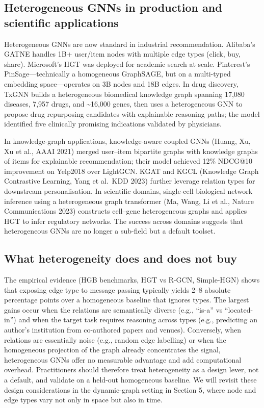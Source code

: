 \documentclass{article}
\begin{document}
\subsection{Heterogeneous GNNs in production and scientific applications}\label{heterogeneous-gnns-in-production-and-scientific-applications}

Heterogeneous GNNs are now standard in industrial recommendation. Alibaba's GATNE handles 1B+ user/item nodes with multiple edge types (click, buy, share). Microsoft's HGT was deployed for academic search at scale. Pinterest's PinSage---technically a homogeneous GraphSAGE, but on a multi-typed embedding space---operates on 3B nodes and 18B edges. In drug discovery, TxGNN \citep{huang20242024} builds a heterogeneous biomedical knowledge graph spanning 17,080 diseases, 7,957 drugs, and \textasciitilde16,000 genes, then uses a heterogeneous GNN to propose drug repurposing candidates with explainable reasoning paths; the model identified five clinically promising indications validated by physicians.

In knowledge-graph applications, knowledge-aware coupled GNNs (Huang, Xu, Xu et al., AAAI 2021) merged user--item bipartite graphs with knowledge graphs of items for explainable recommendation; their model achieved 12\% NDCG@10 improvement on Yelp2018 over LightGCN. KGAT \citep{wang2019heterogeneousgraph} and KGCL (Knowledge Graph Contrastive Learning, Yang et al.~KDD 2023) further leverage relation types for downstream personalisation. In scientific domains, single-cell biological network inference using a heterogeneous graph transformer (Ma, Wang, Li et al., Nature Communications 2023) constructs cell--gene heterogeneous graphs and applies HGT to infer regulatory networks. The success across domains suggests that heterogeneous GNNs are no longer a sub-field but a default toolset.

\subsection{What heterogeneity does and does not buy}\label{what-heterogeneity-does-and-does-not-buy}

The empirical evidence (HGB benchmarks, HGT vs R-GCN, Simple-HGN) shows that exposing edge type to message passing typically yields 2--8 absolute percentage points over a homogeneous baseline that ignores types. The largest gains occur when the relations are semantically diverse (e.g., ``is-a'' vs ``located-in'') and when the target task requires reasoning across types (e.g., predicting an author's institution from co-authored papers and venues). Conversely, when relations are essentially noise (e.g., random edge labelling) or when the homogeneous projection of the graph already concentrates the signal, heterogeneous GNNs offer no measurable advantage and add computational overhead. Practitioners should therefore treat heterogeneity as a design lever, not a default, and validate on a held-out homogeneous baseline. We will revisit these design considerations in the dynamic-graph setting in Section 5, where node and edge types vary not only in space but also in time.
\end{document}
